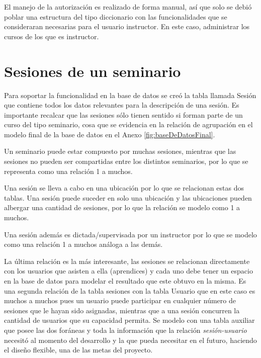 	El manejo de la autorización es realizado de forma manual, así que solo se debió poblar una estructura del tipo diccionario con las funcionalidades que se consideraran necesarias para el usuario instructor. En este caso, administrar los cursos de los que es instructor.
	

	\section{Sesiones de un seminario} %
	\label{sec:sesiones_de_un_seminario}
	
	Para soportar la funcionalidad en la base de datos se creó la tabla llamada Sesión que contiene todos los datos relevantes para la descripción de una sesión. Es importante recalcar que las sesiones sólo tienen sentido si forman parte de un curso del tipo seminario, cosa que se evidencia en la relación de agrupación en el modelo final de la base de datos en el Anexo \ref{fig:baseDeDatosFinal}. 

	Un seminario puede estar compuesto por muchas sesiones, mientras que las sesiones no pueden ser compartidas entre los distintos seminarios, por lo que se representa como una relación 1 a muchos. 

	Una sesión se lleva a cabo en una ubicación por lo que se relacionan estas dos tablas. Una sesión puede suceder en solo una ubicación y las ubicaciones pueden albergar una cantidad de sesiones, por lo que la relación se modelo como 1 a muchos.

	Una sesión además es dictada/supervisada por un instructor por lo que se modelo como una relación 1 a muchos análoga a las demás.

	La última relación es la más interesante, las sesiones se relacionan directamente con los usuarios que asisten a ella (aprendices) y cada uno debe tener un espacio en la base de datos para modelar el resultado que este obtuvo en la misma. Es una segunda relación de la tabla sesiones con la tabla Usuario que en este caso es muchos a muchos pues un usuario puede participar en cualquier número de sesiones que le hayan sido asignadas, mientras que a una sesión concurren la cantidad de usuarios que su capacidad permita. Se modelo con una tabla auxiliar que posee las dos foráneas y toda la información que la relación \emph{sesión-usuario} necesitó al momento del desarrollo y la que pueda necesitar en el futuro, haciendo el diseño flexible, una de las metas del proyecto.

